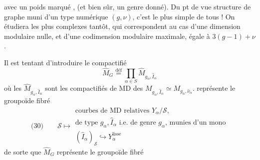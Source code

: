 \documentclass[11pt,a4paper]{article}
\begin{document}
avec un poids marqué \struck{\ill{}}, (et bien sûr, un genre donné).  Du pt de vue structure de graphe muni d'un type numérique $(g,\nu)$, c'est le plus simple de tous ! On étudiera les plus complexes tantôt, qui correspondent au cas d'une dimension modulaire nulle,  et d'une codimension modulaire maximale, égale à $3(g-1)+\nu$.

Il est tentant d'introduire le compactifié
\[
\hat{M}_G \overset{\text{déf}}{=} \prod_{\alpha\in S} \hat{M}_{g_\alpha, \hat{I}_\alpha}
\]
où les $\hat{M}_{g_\alpha, \hat{I}_\alpha}$ sont les compactifiés de MD des $M_{g_\alpha, \hat{I}_\alpha} \simeq M_{g_\alpha, \hat{\nu}_\alpha}$.   représente le groupoïde fibré
\[
\text{(30)}\qquad \mathcal{S} \longmapsto
\begin{array}{l}
\text{courbes de MD relatives } Y_\alpha/\mathcal{S}\text{,} \\
\text{de type } g_\alpha, \hat{I}_\alpha \text{ i.e.\ de genre } g_\alpha\text{, munies d'un mono} \\
(\hat{I}_\alpha)_{\mathcal{S}} \hookrightarrow Y_\alpha^{\text{lisse}}
\end{array}
\]
de sorte que $\hat{M}_G$ représente le groupoïde fibré
\end{document}
